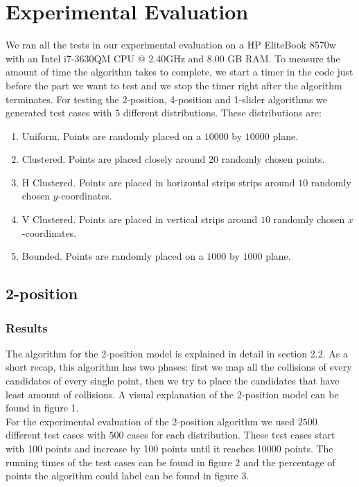 \documentclass[crop=false,a4paper,oneside,11pt]{standalone}
\begin{document}
\section{Experimental Evaluation}

We ran all the tests in our experimental evaluation on a HP EliteBook 8570w with an Intel i7-3630QM CPU @ 2.40GHz and 8.00 GB RAM. To measure the amount of time the algorithm takes to complete, we start a timer in the code just before the part we want to test and we stop the timer right after the algorithm terminates. For testing the 2-position, 4-position and 1-slider algorithms we generated test cases with $5$ different distributions. These distributions are:
\begin{enumerate}
    \item Uniform. Points are randomly placed on a $10000$ by $10000$ plane.
    \item Clustered. Points are placed closely around $20$ randomly chosen points.
    \item H Clustered. Points are placed in horizontal strips strips around $10$ randomly chosen $y$-coordinates.
    \item V Clustered. Points are placed in vertical strips around $10$ randomly chosen $x$-coordinates.
    \item Bounded. Points are randomly placed on a $1000$ by $1000$ plane.
\end{enumerate}

\subsection{2-position}
\subsubsection{Results}
The algorithm for the 2-position model is explained in detail in section 2.2. As a short recap, this algorithm has two phases: first we map all the collisions of every candidates of every single point, then we try to place the candidates that have least amount of collisions. A visual explanation of the 2-position model can be found in figure 1.\\
For the experimental evaluation of the 2-position algorithm we used $2500$ different test cases with $500$ cases for each distribution. These test cases start with 100 points and increase by 100 points until it reaches 10000 points. The running times of the test cases can be found in figure 2 and the percentage of points the algorithm could label can be found in figure 3.\\
\end{document}
